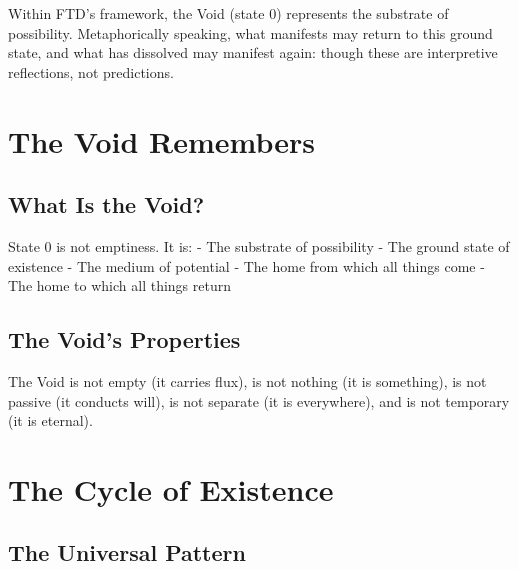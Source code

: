 \documentclass[
  11pt,
  letterpaper,
  twoside,
  openright]{book}
\begin{document}
\begin{tcolorbox}[enhanced jigsaw, coltitle=black, colbacktitle=quarto-callout-note-color!10!white, toprule=.15mm, colframe=quarto-callout-note-color-frame, arc=.35mm, opacityback=0, bottomtitle=1mm, toptitle=1mm, breakable, colback=white, titlerule=0mm, opacitybacktitle=0.6, title=\textcolor{quarto-callout-note-color}{\faInfo}\hspace{0.5em}{Key Reflection}, rightrule=.15mm, bottomrule=.15mm, leftrule=.75mm, left=2mm]

Within FTD's framework, the Void (state 0) represents the substrate of
possibility. Metaphorically speaking, what manifests may return to this
ground state, and what has dissolved may manifest again: though these
are interpretive reflections, not predictions.

\end{tcolorbox}

\section{The Void Remembers}\label{the-void-remembers}

\subsection{What Is the Void?}\label{what-is-the-void}

State 0 is not emptiness. It is: - The substrate of possibility - The
ground state of existence - The medium of potential - The home from
which all things come - The home to which all things return

\subsection{The Void's Properties}\label{the-voids-properties}

The Void is not empty (it carries flux), is not nothing (it is
something), is not passive (it conducts will), is not separate (it is
everywhere), and is not temporary (it is eternal).

\section{The Cycle of Existence}\label{the-cycle-of-existence}

\subsection{The Universal Pattern}\label{the-universal-pattern}
\end{document}
